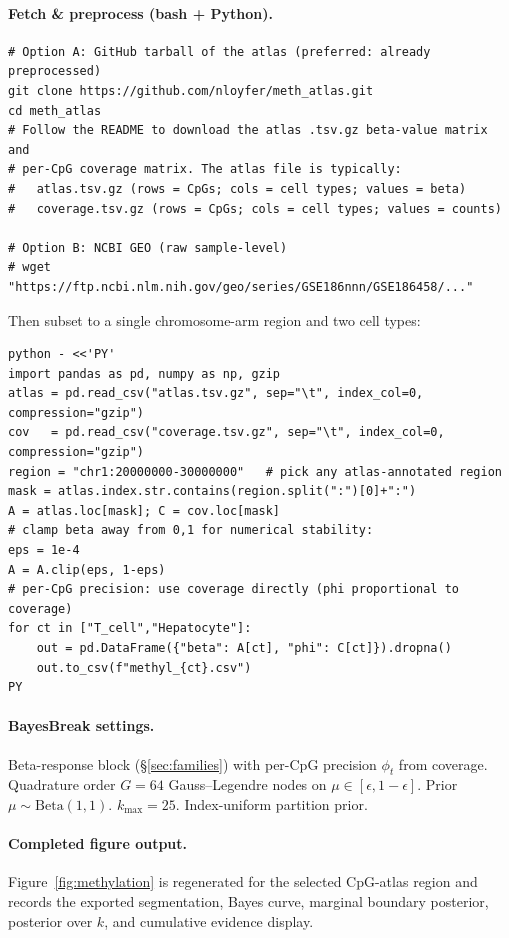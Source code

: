 \paragraph{Fetch \& preprocess (bash + Python).}
\begin{verbatim}
# Option A: GitHub tarball of the atlas (preferred: already preprocessed)
git clone https://github.com/nloyfer/meth_atlas.git
cd meth_atlas
# Follow the README to download the atlas .tsv.gz beta-value matrix and
# per-CpG coverage matrix. The atlas file is typically:
#   atlas.tsv.gz (rows = CpGs; cols = cell types; values = beta)
#   coverage.tsv.gz (rows = CpGs; cols = cell types; values = counts)

# Option B: NCBI GEO (raw sample-level)
# wget "https://ftp.ncbi.nlm.nih.gov/geo/series/GSE186nnn/GSE186458/..."
\end{verbatim}
Then subset to a single chromosome-arm region and two cell types:
\begin{verbatim}
python - <<'PY'
import pandas as pd, numpy as np, gzip
atlas = pd.read_csv("atlas.tsv.gz", sep="\t", index_col=0, compression="gzip")
cov   = pd.read_csv("coverage.tsv.gz", sep="\t", index_col=0, compression="gzip")
region = "chr1:20000000-30000000"   # pick any atlas-annotated region
mask = atlas.index.str.contains(region.split(":")[0]+":")
A = atlas.loc[mask]; C = cov.loc[mask]
# clamp beta away from 0,1 for numerical stability:
eps = 1e-4
A = A.clip(eps, 1-eps)
# per-CpG precision: use coverage directly (phi proportional to coverage)
for ct in ["T_cell","Hepatocyte"]:
    out = pd.DataFrame({"beta": A[ct], "phi": C[ct]}).dropna()
    out.to_csv(f"methyl_{ct}.csv")
PY
\end{verbatim}

\paragraph{BayesBreak settings.}
Beta-response block (\S\ref{sec:families}) with per-CpG precision $\phi_t$ from coverage.
Quadrature order $G=64$ Gauss--Legendre nodes on $\mu\in[\epsilon,1-\epsilon]$. Prior
$\mu\sim\mathrm{Beta}(1,1)$. $k_{\max}=25$. Index-uniform partition prior.

\paragraph{Completed figure output.}
Figure~\ref{fig:methylation} is regenerated for the selected CpG-atlas region and records the exported segmentation, Bayes curve, marginal boundary posterior, posterior over $k$, and cumulative evidence display.

